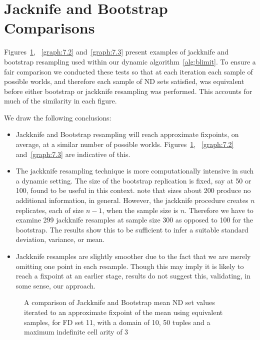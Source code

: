 {\section{Jacknife and Bootstrap Comparisons}

Figures~\ref{graph:7.1}, ~\ref{graph:7.2} and~\ref{graph:7.3} present
examples of jackknife and bootstrap resampling used within our dynamic
algorithm~\ref{alg:blimit}. To ensure a fair comparison we conducted
these tests so that at each iteration each sample of possible worlds,
and therefore each sample of ND sets satisfied, was equivalent before
either bootstrap or jackknife resampling was performed. This accounts
for much of the similarity in each figure.

We draw the following conclusions:
\begin{itemize}
\item Jackknife and Bootstrap resampling will reach approximate
fixpoints, on average, at a similar number of possible
worlds. Figures~\ref{graph:7.1}, ~\ref{graph:7.2} and~\ref{graph:7.3}
are indicative of this. 
\item The jackknife resampling technique is more computationally
intensive in such a dynamic setting. The size of the bootstrap
replication is fixed, say at 50 or 100, found to be useful in this
context. \cite{et86,et93} note that sizes about 200 produce no
additional information, in general. However, the jackknife procedure
creates $n$ replicates, each of size $n-1$, when the sample size is
$n$. Therefore we have to examine 299 jackknife resamples at sample
size 300 as opposed to 100 for the bootstrap. The results show this to
be sufficient to infer a suitable standard deviation, variance, or
mean.
\item Jackknife resamples are slightly smoother due to the fact that
we are merely omitting one point in each resample. Though this may
imply it is likely to reach a fixpoint at an earlier stage, results do
not suggest this, validating, in some sense, our approach.
\end{itemize}


\begin{figure}
\begin{minipage}{7cm}
\centerline{}
\end{minipage}
\hfill
\begin{minipage}{7cm}
\centerline{}
\end{minipage}
\caption{\label{graph:7.1} {A comparison of Jackknife and
Bootstrap mean ND set values iterated to an approximate fixpoint of
the mean using equivalent samples, for FD set 11, with a domain of 10,
50 tuples and a maximum indefinite cell arity of 3}}
\end{figure}


}
